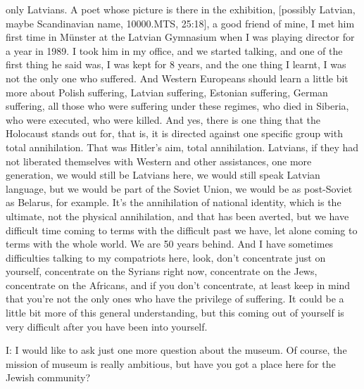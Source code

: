only Latvians. A poet whose picture is there in the exhibition, [possibly Latvian, maybe Scandinavian name, 10000.MTS, 25:18], a good friend of mine, I met him first time in Münster at the Latvian Gymnasium when I was playing director for a year in 1989. I took him in my office, and we started talking, and one of the first thing he said was, I was kept for 8 years, and the one thing I learnt, I was not the only one who suffered. And Western Europeans should learn a little bit more about Polish suffering, Latvian suffering, Estonian suffering, German suffering, all those who were suffering under these regimes, who died in Siberia, who were executed, who were killed. And yes, there is one thing that the Holocaust stands out for, that is, it is directed against one specific group with total annihilation. That was Hitler's aim, total annihilation. Latvians, if they had not liberated themselves with Western and other assistances, one more generation, we would still be Latvians here, we would still speak Latvian language, but we would be part of the Soviet Union, we would be as post-Soviet as Belarus, for example. It's the annihilation of national identity, which is the ultimate, not the physical annihilation, and that has been averted, but we have difficult time coming to terms with the difficult past we have, let alone coming to terms with the whole world. We are 50 years behind. And I have sometimes difficulties talking to my compatriots here, look, don't concentrate just on yourself, concentrate on the Syrians right now, concentrate on the Jews, concentrate on the Africans, and if you don’t concentrate, at least keep in mind that you're not the only ones who have the privilege of suffering. It could be a little bit more of this general understanding, but this coming out of yourself is very difficult after you have been into yourself. 

I: I would like to ask just one more question about the museum. Of course, the mission of museum is really ambitious, but have you got a place here for the Jewish community?

